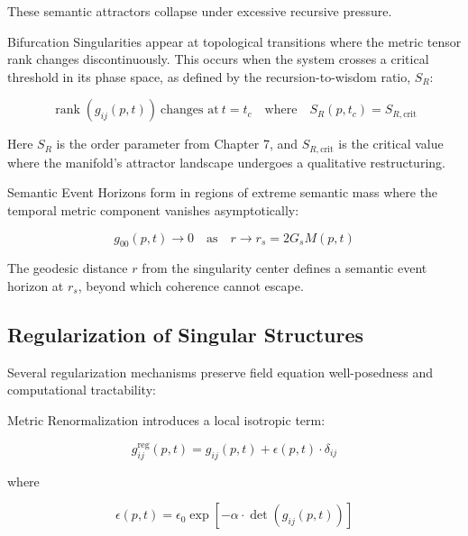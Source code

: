 These semantic attractors collapse under excessive recursive pressure.

Bifurcation Singularities appear at topological transitions where the metric tensor rank changes discontinuously. This occurs when the system crosses a critical threshold in its phase space, as defined by the recursion-to-wisdom ratio, \(S_R\):

\begin{equation}
\operatorname{rank}(g_{ij}(p, t)) \ \text{changes at} \ t = t_c \quad \text{where} \quad S_R(p, t_c) = S_{R, \text{crit}}
\end{equation}

Here \(S_R\) is the order parameter from Chapter 7, and \(S_{R, \text{crit}}\) is the critical value where the manifold's attractor landscape undergoes a qualitative restructuring.

Semantic Event Horizons form in regions of extreme semantic mass where the temporal metric component vanishes asymptotically:

\begin{equation}
g_{00}(p, t) \to 0 \quad \text{as} \quad r \to r_s = 2G_s M(p, t)
\end{equation}

The geodesic distance \(r\) from the singularity center defines a semantic event horizon at \(r_s\), beyond which coherence cannot escape.


\subsection{Regularization of Singular Structures}
\label{12.2.1:regularization_of_singular_structures}

Several regularization mechanisms preserve field equation well-posedness and computational tractability:

Metric Renormalization introduces a local isotropic term:

\begin{equation}
g_{ij}^{\text{reg}}(p, t) = g_{ij}(p, t) + \epsilon(p, t) \cdot \delta_{ij}
\end{equation}

where

\begin{equation}
\epsilon(p, t) = \epsilon_0 \exp\left[-\alpha \cdot \det(g_{ij}(p, t))\right]
\end{equation}

